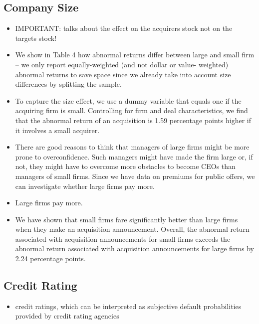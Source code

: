 \documentclass[12pt]{article}
\begin{document}
\subsection{Company Size}

    \begin{itemize}

        \item IMPORTANT: \citet{Moeller2004} talks about the effect on the acquirers stock not on the targets stock! 
        \item We show in Table 4 how abnormal returns differ between large and small firm \citep{Moeller2004} -- we only report equally-weighted (and not dollar or value- weighted) abnormal returns to save space since we already take into account size differences by splitting the sample. 

        \item To capture the size effect, we use a dummy variable that equals one if the acquiring firm is small. Controlling for firm and deal characteristics, we find that the abnormal return of an acquisition is 1.59 percentage points higher if it involves a small acquirer. \citep{Moeller2004}

        \item There are good reasons to think that managers of large firms might be more prone to overconfidence. Such managers might have made the firm large or, if not, they might have to overcome more obstacles to become CEOs than managers of small firms. Since we have data on premiums for public offers, we can investigate whether large firms pay more. \citep{Moeller2004}

        \item Large firms pay more. \citep{Moeller2004}

        \item We have shown that small firms fare significantly better than large firms when they make an acquisition announcement. Overall, the abnormal return associated with acquisition announcements for small firms exceeds the abnormal return associated with acquisition announcements for large firms by 2.24 percentage points.\citep{Moeller2004}


    \end{itemize}
\subsection{Credit Rating}

    \begin{itemize}
        \item credit ratings, which can be interpreted as subjective default probabilities provided by credit rating agencies \citep{Campbell2008}
    \end{itemize}
\end{document}
